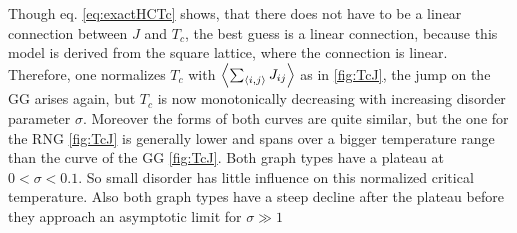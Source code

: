     Though eq. \eqref{eq:exactHCTc} shows, that there does not have
    to be a linear connection between \(J\) and \(T_c\), the best guess
    is a linear connection, because this model is derived from the
    square lattice, where the connection is linear. Therefore, one
    normalizes \(T_c\) with \(\left< \sum_{\left< i,j \right>} J_{ij} \right>\) as in
    \ref{fig:TcJ}, the
    jump on the GG arises again, but \(T_c\) is now monotonically
    decreasing with increasing disorder parameter \(\sigma\).
    Moreover the forms of both curves are quite similar, but the
    one for the RNG \ref{fig:TcJ}
    is generally lower and spans over a bigger temperature range than
    the curve of the GG \ref{fig:TcJ}.
    Both graph types have a plateau at \(0 < \sigma < 0.1\). So small
    disorder has little influence on this normalized critical temperature.
    Also both graph types have a steep decline after the plateau before
    they approach an asymptotic limit for \(\sigma \gg 1\)\\\\

